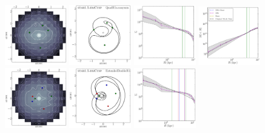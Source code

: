 \documentclass[galley,usenatbib]{mn2e}
\begin{document}
\begin{figure}
\includegraphics[width=0.24\textwidth]{BCQuadR1a-nosymm_Tms-kappa.pdf}
\includegraphics[width=0.24\textwidth]{BCQuadR1a-nosymm_Tms-a.pdf}
\includegraphics[width=0.24\textwidth]{BCQuadR1a-nosymm_Tms-b.pdf}
\includegraphics[width=0.24\textwidth]{BCQuadR1a-nosymm_Tms-c.pdf}\\
\includegraphics[width=0.24\textwidth]{BCExtendedDoubleR1-nosymm_tms-kappa.pdf}
\includegraphics[width=0.24\textwidth]{BCExtendedDoubleR1-nosymm_tms-a.pdf}
\includegraphics[width=0.24\textwidth]{BCExtendedDoubleR1-nosymm_tms-b.pdf}

\end{figure}
\end{document}
